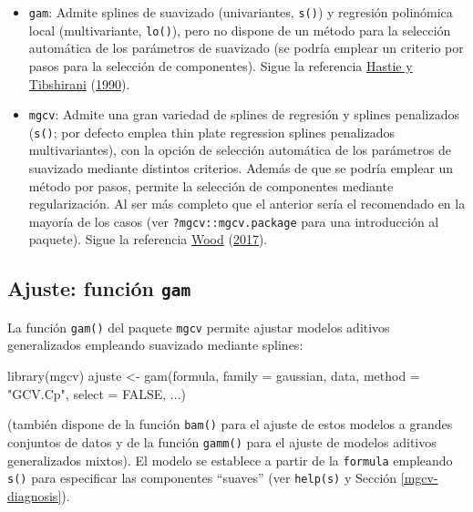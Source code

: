 \documentclass[
  spanish,
]{book}
\newenvironment{Shaded}{\begin{snugshade}}{\end{snugshade}}
\newcommand{\AttributeTok}[1]{\textcolor[rgb]{0.77,0.63,0.00}{#1}}
\newcommand{\ConstantTok}[1]{\textcolor[rgb]{0.00,0.00,0.00}{#1}}
\newcommand{\FunctionTok}[1]{\textcolor[rgb]{0.00,0.00,0.00}{#1}}
\newcommand{\NormalTok}[1]{#1}
\newcommand{\OtherTok}[1]{\textcolor[rgb]{0.56,0.35,0.01}{#1}}
\newcommand{\StringTok}[1]{\textcolor[rgb]{0.31,0.60,0.02}{#1}}
\theoremstyle{break}
\theoremstyle{definition}
\theoremstyle{definition}
\theoremstyle{definition}
\theoremstyle{definition}
\theoremstyle{remark}
\begin{document}
\begin{itemize}
\item
  \texttt{gam}: Admite splines de suavizado (univariantes, \texttt{s()}) y regresión polinómica local (multivariante, \texttt{lo()}), pero no dispone de un método para la selección automática de los parámetros de suavizado (se podría emplear un criterio por pasos para la selección de componentes).
  Sigue la referencia \protect\hyperlink{ref-hastie1990generalized}{Hastie y Tibshirani} (\protect\hyperlink{ref-hastie1990generalized}{1990}).
\item
  \texttt{mgcv}: Admite una gran variedad de splines de regresión y splines penalizados (\texttt{s()}; por defecto emplea thin plate regression splines penalizados multivariantes), con la opción de selección automática de los parámetros de suavizado mediante distintos criterios.
  Además de que se podría emplear un método por pasos, permite la selección de componentes mediante regularización.
  Al ser más completo que el anterior sería el recomendado en la mayoría de los casos (ver \texttt{?mgcv::mgcv.package} para una introducción al paquete).
  Sigue la referencia \protect\hyperlink{ref-wood2017generalized}{Wood} (\protect\hyperlink{ref-wood2017generalized}{2017}).
\end{itemize}

\hypertarget{ajuste-funciuxf3n-gam}{%
\subsection{\texorpdfstring{Ajuste: función \texttt{gam}}{Ajuste: función gam}}\label{ajuste-funciuxf3n-gam}}

La función \texttt{gam()} del paquete \texttt{mgcv} permite ajustar modelos aditivos generalizados empleando suavizado mediante splines:

\begin{Shaded}
\begin{Highlighting}[]
\FunctionTok{library}\NormalTok{(mgcv)}
\NormalTok{ajuste }\OtherTok{\textless{}{-}} \FunctionTok{gam}\NormalTok{(formula, }\AttributeTok{family =}\NormalTok{ gaussian, data, }\AttributeTok{method =} \StringTok{"GCV.Cp"}\NormalTok{, }\AttributeTok{select =} \ConstantTok{FALSE}\NormalTok{, ...)}
\end{Highlighting}
\end{Shaded}

(también dispone de la función \texttt{bam()} para el ajuste de estos modelos a grandes conjuntos de datos y de la función \texttt{gamm()} para el ajuste de modelos aditivos generalizados mixtos). El modelo se establece a partir de la \texttt{formula} empleando \texttt{s()} para especificar las componentes ``suaves'' (ver \texttt{help(s)} y Sección \ref{mgcv-diagnosis}).
\end{document}
